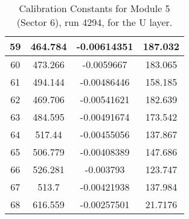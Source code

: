 \begin{table}[h]
{\begin{tabular}{|c|c|c|c|}
59	&	464.784	&	-0.00614351	&	187.032	\\	\hline
60	&	473.266	&	-0.0059667	&	183.065	\\	\hline
61	&	494.144	&	-0.00486446	&	158.185	\\	\hline
62	&	469.706	&	-0.00541621	&	182.639	\\	\hline
63	&	484.595	&	-0.00491674	&	173.542	\\	\hline
64	&	517.44	&	-0.00455056	&	137.867	\\	\hline
65	&	506.779	&	-0.00408389	&	147.686	\\	\hline
66	&	526.281	&	-0.003793	&	123.747	\\	\hline
67	&	513.7	&	-0.00421938	&	137.984	\\	\hline
68	&	616.559	&	-0.00257501	&	21.7176	\\	\hline
            \end{tabular}
        }
        \caption{Calibration Constants for Module 5 (Sector 6), run 4294, for the U layer.}
\end{table}


